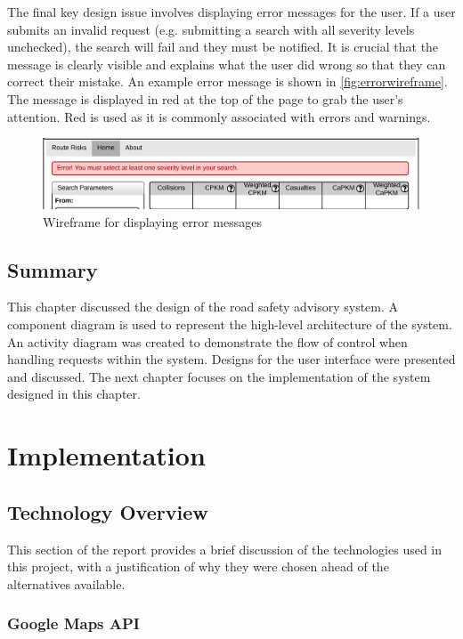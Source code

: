 \documentclass[authoryearcitations]{UoYCSproject}
\begin{document}
The final key design issue involves displaying error messages for the user. If a user submits an invalid request (e.g. submitting a search with all severity levels unchecked), the search will fail and they must be notified. It is crucial that the message is clearly visible and explains what the user did wrong so that they can correct their mistake. An example error message is shown in \autoref{fig:errorwireframe}. The message is displayed in red at the top of the page to grab the user's attention. Red is used as it is commonly associated with errors and warnings.

\begin{figure}
	\center
	\includegraphics[scale=0.8]{ErrorWireframe}
	\caption{Wireframe for displaying error messages}
	\label{fig:errorwireframe}
\end{figure}

\section{Summary}

This chapter discussed the design of the road safety advisory system. A component diagram is used to represent the high-level architecture of the system. An activity diagram was created to demonstrate the flow of control when handling requests within the system. Designs for the user interface were presented and discussed. The next chapter focuses on the implementation of the system designed in this chapter.

\chapter{Implementation}

\section{Technology Overview}

This section of the report provides a brief discussion of the technologies used in this project, with a justification of why they were chosen ahead of the alternatives available.

\subsection{Google Maps API}
\end{document}

